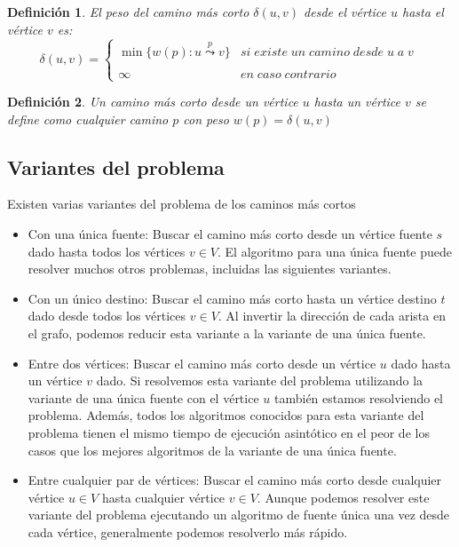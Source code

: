 \documentclass[12pt]{article}
\newcommand{\nl}{\vspace{0.3cm}}
\newtheorem{definition}{Definición}
\begin{document}
\begin{definition}
	El peso del camino más corto $\delta(u, v)$ desde el vértice $u$ hasta el vértice $v$ es:
	$$\delta(u, v) = \left\{ 
			\begin{array}{lcc}
				\min \{ w(p): u \stackrel{p}{\leadsto} v \} & si\; existe\; un\; camino\; desde\; u\; a\; v\; \\\\
				\infty & en\; caso\; contrario\;
			\end{array}
		\right. $$
\end{definition}

\begin{definition}
	Un camino más corto desde un vértice $u$ hasta un vértice $v$ se define como cualquier camino $p$ con peso $w(p) = \delta(u, v)$
\end{definition}

\subsection{Variantes del problema}

\nl

Existen varias variantes del problema de los caminos más cortos

\begin{itemize}
	\item Con una única fuente: Buscar el camino más corto desde un vértice fuente $s$ dado hasta todos los vértices $v \in V$. El algoritmo para una única fuente puede resolver muchos otros problemas, incluidas las siguientes variantes.
	\item Con un único destino: Buscar el camino más corto hasta un vértice destino $t$ dado desde todos los vértices $v \in V$. Al invertir la dirección de cada arista en el grafo, podemos reducir esta variante a la variante de una única fuente.
	\item Entre dos vértices: Buscar el camino más corto desde un vértice $u$ dado hasta un vértice $v$ dado. Si resolvemos esta variante del problema utilizando la variante de una única fuente con el vértice $u$ también estamos resolviendo el problema. Además, todos los algoritmos conocidos para esta variante del problema tienen el mismo tiempo de ejecución asintótico en el peor de los casos que los mejores algoritmos de la variante de una única fuente.
	\item Entre cualquier par de vértices: Buscar el camino más corto desde cualquier vértice $u \in V$ hasta cualquier vértice $v \in V$. Aunque podemos resolver este variante del problema ejecutando un algoritmo de fuente única una vez desde cada vértice, generalmente podemos resolverlo más rápido.
\end{itemize}
\end{document}
